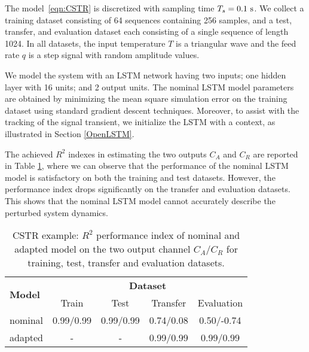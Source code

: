 \documentclass{article}
\begin{document}
The model~\eqref{eqn:CSTR}  is discretized with sampling time $T_s = 0.1~\rm{s}$. We collect a training dataset consisting of 64 sequences containing 256 samples, and a test, transfer, and evaluation dataset each consisting of a single sequence of length 1024. In all datasets, the input temperature $T$  is a triangular wave and the feed rate $q$ is a step signal with random amplitude values. 


We model the system with an LSTM network \cite{hochreiter1997a,greff_lstm_2017} having two inputs; one hidden layer with 16 units; and 2 output units. The nominal LSTM model parameters are obtained by minimizing the mean square simulation error on the training dataset using standard gradient descent techniques. Moreover, to assist with the tracking of the signal transient, we initialize the LSTM with a context, as illustrated in Section \ref{OpenLSTM}. 

The achieved $R^2$ indexes in estimating the two outputs $C_A$ and $C_R$ are  reported in Table \ref{tab:CSTR_performance}, where we can observe that the performance of the nominal LSTM model is satisfactory on both the training and test datasets. However, the performance index drops significantly on the transfer and evaluation datasets. This shows that the nominal LSTM model cannot accurately describe the perturbed system dynamics. 

\begin{table}%
\centering
\begin{tabular}{l | c  c  c  c}
\multirow{2}{*}{\textbf{Model}} & \multicolumn{4}{c}{\textbf{Dataset}} \\
                & Train      & Test       & Transfer & Evaluation       \\ %
\hline
nominal         & 0.99/0.99       & 0.99/0.99        & 0.74/0.08      & 0.50/-0.74  \\
adapted         & -          & -          & 0.99/0.99     & 0.99/0.99  \\
\hline
\end{tabular}
\caption{CSTR example: $R^2$ performance index of  nominal and  adapted model on the two output channel $C_A$/$C_R$ for training, test, transfer and evaluation  datasets. }
\label{tab:CSTR_performance}
\end{table}
\end{document}
